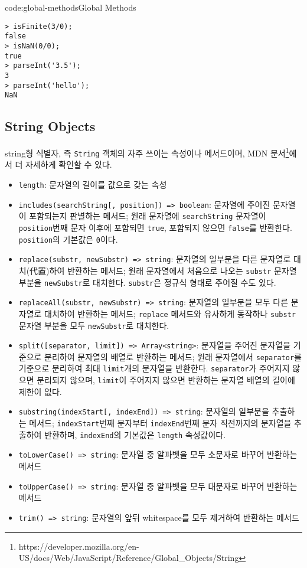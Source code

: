 \begin{codeenv}{code:global-methods}{Global Methods}\begin{verbatim}
> isFinite(3/0);
false
> isNaN(0/0);
true
> parseInt('3.5');
3
> parseInt('hello');
NaN
\end{verbatim}
\end{codeenv}

\subsection*{String Objects}

string형 식별자, 즉 \texttt{String} 객체의 자주 쓰이는 속성이나 메서드이며, MDN 문서\footnote{https://developer.mozilla.org/en-US/docs/Web/JavaScript/Reference/Global\_Objects/String}에서 더 자세하게 확인할 수 있다.

\begin{itemize}
    \item \texttt{length}: 문자열의 길이를 값으로 갖는 속성
    \item \texttt{includes(searchString[, position]) => boolean}: 문자열에 주어진 문자열이 포함되는지 판별하는 메서드; 원래 문자열에 \texttt{searchString} 문자열이 \texttt{position}번째 문자 이후에 포함되면 \texttt{true}, 포함되지 않으면 \texttt{false}를 반환한다. \texttt{position}의 기본값은 \texttt{0}이다.
    \item \texttt{replace(substr, newSubstr) => string}: 문자열의 일부분을 다른 문자열로 대치(代置)하여 반환하는 메서드; 원래 문자열에서 처음으로 나오는 \texttt{substr} 문자열 부분을 \texttt{newSubstr}로 대치한다. \texttt{substr}은 정규식 형태로 주어질 수도 있다.
    \item \texttt{replaceAll(substr, newSubstr) => string}: 문자열의 일부분을 모두 다른 문자열로 대치하여 반환하는 메서드; \texttt{replace} 메서드와 유사하게 동작하나 \texttt{substr} 문자열 부분을 모두 \texttt{newSubstr}로 대치한다.
    \item \texttt{split([separator, limit]) => Array<string>}: 문자열을 주어진 문자열을 기준으로 분리하여 문자열의 배열로 반환하는 메서드; 원래 문자열에서 \texttt{separator}를 기준으로 분리하여 최대 \texttt{limit}개의 문자열을 반환한다. \texttt{separator}가 주어지지 않으면 분리되지 않으며, \texttt{limit}이 주어지지 않으면 반환하는 문자열 배열의 길이에 제한이 없다.
    \item \texttt{substring(indexStart[, indexEnd]) => string}: 문자열의 일부분을 추출하는 메서드; \texttt{indexStart}번째 문자부터 \texttt{indexEnd}번째 문자 직전까지의 문자열을 추출하여 반환하며, \texttt{indexEnd}의 기본값은 \texttt{length} 속성값이다.
    \item \texttt{toLowerCase() => string}: 문자열 중 알파벳을 모두 소문자로 바꾸어 반환하는 메서드
    \item \texttt{toUpperCase() => string}: 문자열 중 알파벳을 모두 대문자로 바꾸어 반환하는 메서드
    \item \texttt{trim() => string}: 문자열의 앞뒤 whitespace를 모두 제거하여 반환하는 메서드
\end{itemize}

